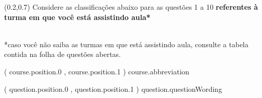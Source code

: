 \documentclass[a4paper]{article}
\begin{document}
\begin{examcopy}[1]
\begin{textblock}{7.0}(0.2,0.7)
    \fontsize{6}{6}\selectfont    
    Considere as classificações abaixo para as questões 1 a 10 \textbf{referentes à turma em que você está assistindo aula*}

    \\
    \fontsize{5}{5}\selectfont
    *caso você não saiba as turmas em que está assistindo aula, consulte a tabela contida na folha de questões abertas.
\end{textblock}

{%
  \begin{textblock}{0.80}( {{course.position.0}} , {{course.position.1}} )
    \selectfont
    {{course.abbreviation}}
  \end{textblock}
{%

{%
  \begin{textblock}{7.4}( {{question.position.0}} , {{question.position.1}} )
    \selectfont
    {{question.questionWording}}
  \end{textblock}
{%

}}}}
\end{examcopy}
\end{document}
